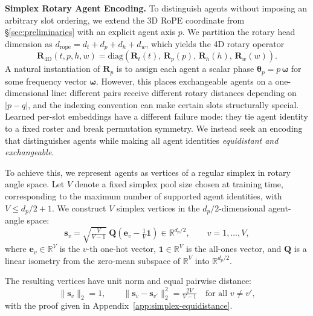 \documentclass{llmxive}
\begin{document}
\noindent\textbf{Simplex Rotary Agent Encoding.}
\label{sec:simplex-rotary-agent-encoding}
To distinguish agents without imposing an arbitrary slot ordering, we extend the 3D RoPE coordinate from \S\ref{sec:preliminaries} with an explicit agent axis $p$.
We partition the rotary head dimension as
$d_{\mathrm{rope}}=d_t+d_p+d_h+d_w$,
which yields the 4D rotary operator
\begin{equation}
\mathbf{R}_{\mathrm{4D}}(t,p,h,w) = \mathrm{diag}\!\left(\mathbf{R}_{t}(t),\,\mathbf{R}_{p}(p),\,\mathbf{R}_{h}(h),\,\mathbf{R}_{w}(w)\right).
\end{equation}
A natural instantiation of $\mathbf{R}_{p}$ is to assign each agent a scalar phase $\boldsymbol{\theta}_p=p\,\boldsymbol{\omega}$ for some frequency vector $\boldsymbol{\omega}$.
However, this places exchangeable agents on a one-dimensional line: different pairs receive different rotary distances depending on $|p-q|$, and the indexing convention can make certain slots structurally special.
Learned per-slot embeddings have a different failure mode: they tie agent identity to a fixed roster and break permutation symmetry.
We instead seek an encoding that distinguishes agents while making all agent identities \emph{equidistant and exchangeable}.


To achieve this, we represent agents as vertices of a regular simplex in rotary angle space.
Let $V$ denote a fixed simplex pool size chosen at training time, corresponding to the maximum number of supported agent identities, with $V\leq d_p/2+1$.
We construct $V$ simplex vertices in the $d_p/2$-dimensional agent-angle space:
\begin{equation}
\mathbf{s}_v
=
\sqrt{\tfrac{V}{V-1}}\;
\mathbf{Q}\!\left(\mathbf{e}_v-\tfrac{1}{V}\mathbf{1}\right)
\in\mathbb{R}^{d_p/2},
\qquad v=1,\ldots,V,
\end{equation}
where $\mathbf{e}_v\in\mathbb{R}^{V}$ is the $v$-th one-hot vector, $\mathbf{1}\in\mathbb{R}^{V}$ is the all-ones vector, and $\mathbf{Q}$ is a linear isometry from the zero-mean subspace of $\mathbb{R}^{V}$ into $\mathbb{R}^{d_p/2}$.


The resulting vertices have unit norm and equal pairwise distance:
\begin{equation}
\|\mathbf{s}_v\|_2=1,\qquad
\|\mathbf{s}_v-\mathbf{s}_{v'}\|_2^2=\tfrac{2V}{V-1}
\quad\text{for all }v\neq v',
\end{equation}
with the proof given in Appendix~\ref{app:simplex-equidistance}.
\end{document}
